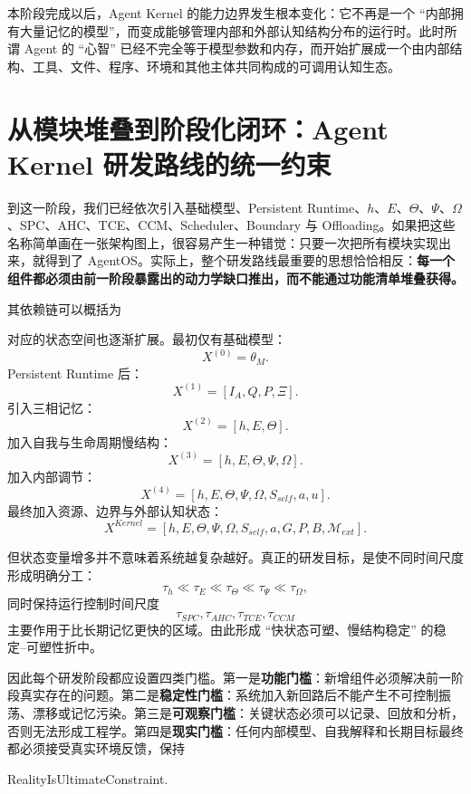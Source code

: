 本阶段完成以后，Agent Kernel 的能力边界发生根本变化：它不再是一个 ``内部拥有大量记忆的模型''，而变成能够管理内部和外部认知结构分布的运行时。此时所谓 Agent 的 ``心智'' 已经不完全等于模型参数和内存，而开始扩展成一个由内部结构、工具、文件、程序、环境和其他主体共同构成的可调用认知生态。

\section{从模块堆叠到阶段化闭环：Agent Kernel 研发路线的统一约束}

到这一阶段，我们已经依次引入基础模型、Persistent Runtime、$h$、$E$、$\Theta$、$\Psi$、$\Omega$、SPC、AHC、TCE、CCM、Scheduler、Boundary 与 Offloading。如果把这些名称简单画在一张架构图上，很容易产生一种错觉：只要一次把所有模块实现出来，就得到了 AgentOS。实际上，整个研发路线最重要的思想恰恰相反：\textbf{每一个组件都必须由前一阶段暴露出的动力学缺口推出，而不能通过功能清单堆叠获得。}

其依赖链可以概括为
\begin{statementbox}
\centering
{}
\end{statementbox}

对应的状态空间也逐渐扩展。最初仅有基础模型：
\[
X^{(0)}=\theta_M.
\]
Persistent Runtime 后：
\[
X^{(1)}
=
[I_A,Q,P,\Xi].
\]
引入三相记忆：
\[
X^{(2)}
=
[h,E,\Theta].
\]
加入自我与生命周期慢结构：
\[
X^{(3)}
=
[h,E,\Theta,\Psi,\Omega].
\]
加入内部调节：
\[
X^{(4)}
=
[h,E,\Theta,\Psi,\Omega,S_{self},a,u].
\]
最终加入资源、边界与外部认知状态：
\[
X^{Kernel}
=
[
h,E,\Theta,\Psi,\Omega,
S_{self},a,
G,
P,
B,
\mathcal M_{ext}
].
\]

但状态变量增多并不意味着系统越复杂越好。真正的研发目标，是使不同时间尺度形成明确分工：
\[
\tau_h
\ll
\tau_E
\ll
\tau_\Theta
\ll
\tau_\Psi
\ll
\tau_\Omega,
\]
同时保持运行控制时间尺度
\[
\tau_{SPC},
\tau_{AHC},
\tau_{TCE},
\tau_{CCM}
\]
主要作用于比长期记忆更快的区域。由此形成 ``快状态可塑、慢结构稳定'' 的稳定--可塑性折中。

因此每个研发阶段都应设置四类门槛。第一是\textbf{功能门槛}：新增组件必须解决前一阶段真实存在的问题。第二是\textbf{稳定性门槛}：系统加入新回路后不能产生不可控制振荡、漂移或记忆污染。第三是\textbf{可观察门槛}：关键状态必须可以记录、回放和分析，否则无法形成工程学。第四是\textbf{现实门槛}：任何内部模型、自我解释和长期目标最终都必须接受真实环境反馈，保持
\begin{statementbox}
RealityIsUltimateConstraint.
\end{statementbox}

